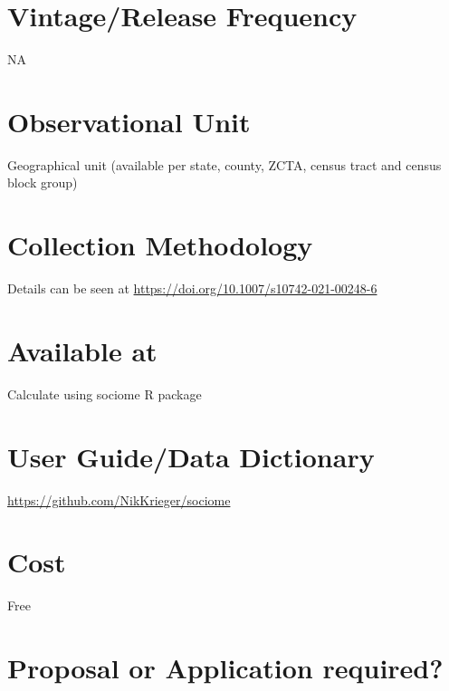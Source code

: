 \documentclass[
]{book}
\begin{document}
\hypertarget{vintagerelease-frequency-10}{%
\section{Vintage/Release Frequency}\label{vintagerelease-frequency-10}}

NA

\hypertarget{observational-unit-10}{%
\section{Observational Unit}\label{observational-unit-10}}

Geographical unit (available per state, county, ZCTA, census tract and census block group)

\hypertarget{collection-methodology-10}{%
\section{Collection Methodology}\label{collection-methodology-10}}

Details can be seen at \url{https://doi.org/10.1007/s10742-021-00248-6}

\hypertarget{available-at-10}{%
\section{Available at}\label{available-at-10}}

Calculate using sociome R package

\hypertarget{user-guidedata-dictionary-10}{%
\section{User Guide/Data Dictionary}\label{user-guidedata-dictionary-10}}

\url{https://github.com/NikKrieger/sociome}

\hypertarget{cost-10}{%
\section{Cost}\label{cost-10}}

Free

\hypertarget{proposal-or-application-required-10}{%
\section{Proposal or Application required?}\label{proposal-or-application-required-10}}
\end{document}
